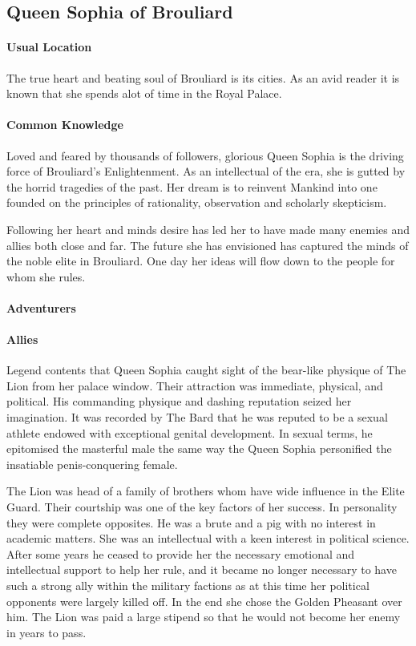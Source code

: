 \begin{multicols}{2}
\subsection{Queen Sophia of Brouliard}
    \paragraph{Usual Location} The true heart and beating soul of Brouliard is its cities. As an avid reader it is known that she spends alot of time in the Royal Palace. 
    \paragraph{Common Knowledge} Loved and feared by thousands of followers, glorious Queen Sophia is the driving force of Brouliard's Enlightenment. As an intellectual of the era, she is gutted by the horrid tragedies of the past. Her dream is to reinvent Mankind into one founded on the principles of rationality, observation and scholarly skepticism.
    
Following her heart and minds desire has led her to have made many enemies and allies both close and far. The future she has envisioned has captured the minds of the noble elite in Brouliard. One day her ideas will flow down to the people for whom she rules.  
    \paragraph{Adventurers}
    \paragraph{Allies} Legend contents that Queen Sophia caught sight of the bear-like physique of The Lion from her palace window. Their attraction was immediate, physical, and political. His commanding physique and dashing reputation seized her imagination. It was recorded by The Bard that he was reputed to be a sexual athlete endowed with exceptional genital development. In sexual terms, he epitomised the masterful male the same way the Queen Sophia personified the insatiable penis-conquering female.

The Lion was head of a family of brothers whom have wide influence in the Elite Guard. Their courtship was one of the key factors of her success. In personality they were complete opposites. He was a brute and a pig with no interest in academic matters. She was an intellectual with a keen interest in political science. After some years he ceased to provide her the necessary emotional and intellectual support to help her rule, and it became no longer necessary to have such a strong ally within the military factions as at this time her political opponents were largely killed off. In the end she chose the Golden Pheasant over him. The Lion was paid a large stipend so that he would not become her enemy in years to pass.

\end{multicols}
